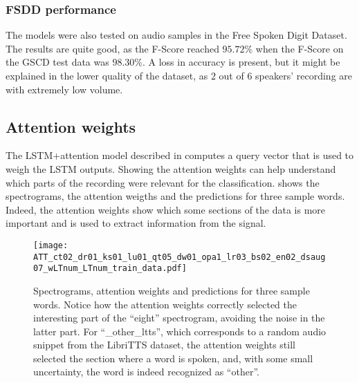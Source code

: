 \subsubsection{FSDD performance}

The models were also tested on audio samples in the Free Spoken Digit Dataset.
The results are quite good, as the F-Score reached $95.72\%$
when the F-Score on the GSCD test data was $98.30\%$.
%
A loss in accuracy is present, but it might be explained in the
lower quality of the dataset, as $2$ out of $6$ speakers' recording
are with extremely low volume.

\subsection{Attention weights}



The LSTM+attention model described in  computes a query
vector that is used to weigh the LSTM outputs. Showing the attention weights
can help understand which parts of the recording were relevant for the
classification.
 shows the spectrograms, the attention
weigths and the predictions for three sample words.
Indeed, the attention weights show which some sections of the data is more important
and is used to extract information from the signal.

\begin{figure*}[t!]
    \centering
    \texttt{[image: ATT\_ct02\_dr01\_ks01\_lu01\_qt05\_dw01\_opa1\_lr03\_bs02\_en02\_dsaug07\_wLTnum\_LTnum\_train\_data.pdf]}
    \caption{Spectrograms, attention weights and predictions for three sample words.
    Notice how the attention weights correctly selected the interesting part of
    the ``eight'' spectrogram, avoiding the noise in the latter part.
    For ``\_other\_ltts'', which corresponds to a random audio snippet from the LibriTTS
    dataset, the attention weights still selected the section where a word is spoken,
    and, with some small uncertainty, the word is indeed recognized as ``other''.}%
    \label{fig:attention_weights_standard}
\end{figure*}

